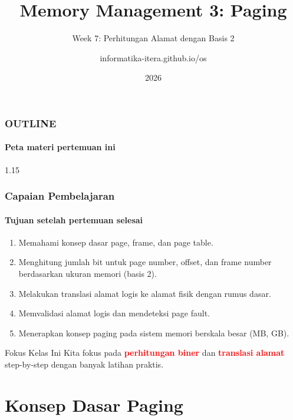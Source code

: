 \documentclass[t,aspectratio=169,xcolor=dvipsnames]{beamer}
\title[Paging and Address Translation]{Memory Management 3: Paging}
\subtitle{Week 7: Perhitungan Alamat dengan Basis 2}
\author[informatika-itera.github.io/os]{informatika-itera.github.io/os}
\institute[ITERA]{Program Studi Teknik Informatika \\ Institut Teknologi Sumatera}
\date{\textcolor{nyublue}{2026}}
\newcommand{\tem}[1]{\textbf{\textcolor{red}{#1}}}
\begin{document}
\begin{frame}
    \titlepage
\end{frame}

\begin{frame}
    \frametitle{OUTLINE}
    \framesubtitle{Peta materi pertemuan ini}
    \small
    \begin{spacing}{1.15}
        \tableofcontents
    \end{spacing}
\end{frame}

\begin{frame}
    \frametitle{Capaian Pembelajaran}
    \framesubtitle{Tujuan setelah pertemuan selesai}
    \small
    \begin{enumerate}
        \item Memahami konsep dasar page, frame, dan page table.
        \item Menghitung jumlah bit untuk page number, offset, dan frame number berdasarkan ukuran memori (basis 2).
        \item Melakukan translasi alamat logis ke alamat fisik dengan rumus dasar.
        \item Memvalidasi alamat logis dan mendeteksi page fault.
        \item Menerapkan konsep paging pada sistem memori berskala besar (MB, GB).
    \end{enumerate}
    \begin{exampleblock}{Fokus Kelas Ini}
        Kita fokus pada \tem{perhitungan biner} dan \tem{translasi alamat} step-by-step dengan banyak latihan praktis.
    \end{exampleblock}
\end{frame}

\section{Konsep Dasar Paging}
\end{document}
